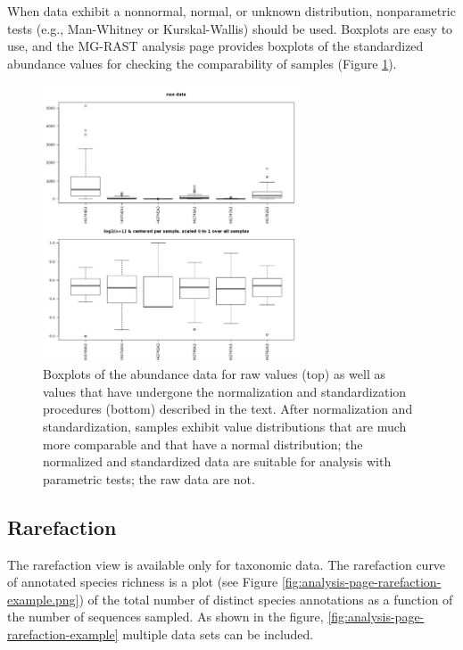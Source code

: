 \documentclass[12pt,fullpage]{report}
\begin{document}
When data exhibit a nonnormal, normal, or unknown distribution, nonparametric tests (e.g., Man-Whitney or Kurskal-Wallis) should be used. Boxplots are easy to use, and the MG-RAST analysis page provides boxplots of the standardized abundance values for checking the comparability of samples (Figure \ref{fig:boxplots}).

\begin{figure}
\begin{center}
\includegraphics[width=3in]{Images/boxplots.png}
\end{center}
\caption{
Boxplots of the abundance data for raw values (top) as well as values that have undergone the normalization and standardization procedures (bottom) described in the text. After normalization and standardization, samples exhibit value distributions that are much more comparable and that have a normal distribution; the normalized and standardized data are suitable for analysis with parametric tests; the raw data are not.
}
\label{fig:boxplots}
\end{figure}


\subsection{Rarefaction}
\label{section:analysis-page-rarefaction}

The rarefaction view is available only for taxonomic data. The
rarefaction curve of annotated species richness is a plot (see Figure
\ref{fig:analysis-page-rarefaction-example.png}) of the total number
of distinct species annotations as a function of the number of
sequences sampled. As shown in the figure, \ref{fig:analysis-page-rarefaction-example}
multiple data sets can be included.
\end{document}
